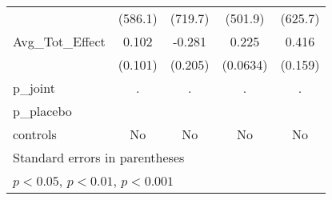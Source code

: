 {\begin{tabular}{l*{4}{c}}
            &     (586.1)         &     (719.7)         &     (501.9)         &     (625.7)         \\
\addlinespace
Avg\_Tot\_Effect&       0.102         &      -0.281         &       0.225\sym{***}&       0.416\sym{**} \\
            &     (0.101)         &     (0.205)         &    (0.0634)         &     (0.159)         \\
\midrule
p\_joint     &           .         &           .         &           .         &           .         \\
p\_placebo   &                     &                     &                     &                     \\
controls    &          No         &          No         &          No         &          No         \\
\bottomrule
\multicolumn{5}{l}{\footnotesize Standard errors in parentheses}\\
\multicolumn{5}{l}{\footnotesize \sym{*} \(p<0.05\), \sym{**} \(p<0.01\), \sym{***} \(p<0.001\)}\\
\end{tabular}
}

